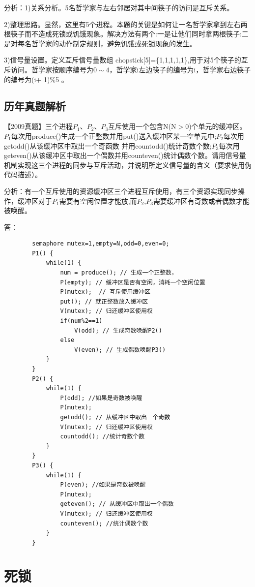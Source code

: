 \documentclass[lang=cn,10pt]{elegantbook}
\begin{document}
分析：1)关系分析。5名哲学家与左右邻居对其中间筷子的访问是互斥关系。

2)整理思路。显然，这里有5个进程。本题的关键是如何让一名哲学家拿到左右两根筷子而不造成死锁或饥饿现象。解决方法有两个:一是让他们同时拿两根筷子:二是对每名哲学家的动作制定规则，避免饥饿或死锁现象的发生。

3)信号量设置。定义互斥信号量数组 chopstick[5]=\{1,1,1,1,1\},用于对5个筷子的互斥访问。哲学家按顺序编号为$0 \sim 4$，哲学家i左边筷子的编号为i，哲学家右边筷子的编号为(i+ 1)\%5 。

\subsection{历年真题解析}

    【2009真题】三个进程$P_1$、$P_2$、$P_3$互斥使用一个包含N(N$>$0)个单元的缓冲区。$P_1$每次用produce()生成一个正整数并用put()送入缓冲区某一空单元中;$P_2$每次用getodd()从该缓冲区中取出一个奇函数
    并用countodd()统计奇数个数;$P_3$每次用geteven()从该缓冲区中取出一个偶数并用counteven()统计偶数个数。请用信号量机制实现这三个进程的同步与互斥活动，并说明所定义信号量的含义（要求使用伪代码描述）。
    
    分析：有一个互斥使用的资源缓冲区三个进程互斥使用，有三个资源实现同步操作，缓冲区对于$P_1$需要有空闲位置才能放,而$P_2$,$P_3$需要缓冲区有奇数或者偶数才能被唤醒。
    
    答：
    \begin{lstlisting}
        semaphore mutex=1,empty=N,odd=0,even=0;  
        P1() { 
            while(1) {
                num = produce(); // 生成一个正整数，
                P(empty); // 缓冲区是否有空闲，消耗一个空闲位置
                P(mutex);  // 互斥使用缓冲区
                put(); // 就正整数放入缓冲区
                V(mutex); // 归还缓冲区使用权
                if(num%2==1)  
                    V(odd); // 生成奇数唤醒P2()
                else
                    V(even); // 生成偶数唤醒P3()
            }
        }
        P2() {
            while(1) {
                P(odd); //如果是奇数被唤醒
                P(mutex);
                getodd(); // 从缓冲区中取出一个奇数
                V(mutex); // 归还缓冲区使用权
                countodd(); //统计奇数个数
            }
        }
        P3() {
            while(1) {
                P(even); //如果是奇数被唤醒
                P(mutex);
                geteven(); // 从缓冲区中取出一个偶数
                V(mutex); // 归还缓冲区使用权
                counteven(); //统计偶数个数
            }
        }
    \end{lstlisting}

\section{死锁}
\end{document}
